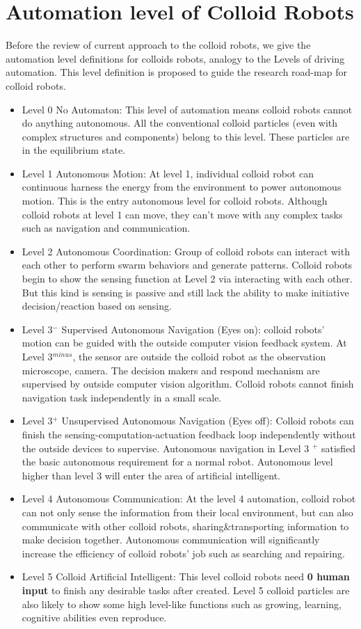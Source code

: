 \section{Automation level of Colloid Robots}
Before the review of current approach to the colloid robots, 
we give the  automation level definitions for colloids robots,  analogy to the Levels of driving automation\cite{taeihagh2019governing}. This level definition is proposed to guide the research road-map for colloid robots.
\begin{itemize}
    \item Level 0 No Automaton: This level of automation means colloid robots cannot do anything autonomous. All the conventional colloid particles (even with complex structures and components) belong to this level. These particles are in the equilibrium state.
    \item Level 1 Autonomous  Motion: At level 1, individual colloid robot can continuous harness the energy from the environment to power autonomous motion. This is the entry autonomous level for colloid robots. Although colloid robots at level 1 can move, they can't move with any complex tasks such as navigation and communication.
    \item Level 2 Autonomous Coordination: Group of colloid robots can interact with each other to perform swarm behaviors and generate patterns. Colloid robots begin to show the sensing function at Level 2 via interacting with each other. But this kind is sensing is passive  and still lack the ability to make initiative decision/reaction based on sensing. 
    \item Level 3$^{-}$ Supervised Autonomous Navigation (Eyes on): colloid robots' motion can be guided with the outside computer vision feedback system. At Level 3$^{minus}$, the sensor are outside the colloid robot as the observation microscope, camera. The decision makers and respond mechanism are supervised by outside computer vision algorithm. Colloid robots cannot finish navigation task independently in a small scale.
    \item Level 3$^{+}$ Unsupervised Autonomous Navigation (Eyes off): Colloid robots can finish the sensing-computation-actuation feedback loop independently without the outside devices to supervise. Autonomous navigation in Level 3 $^{+}$ satisfied the basic autonomous requirement for a normal robot. Autonomous level higher than level 3 will enter the area of artificial intelligent.
    \item Level 4 Autonomous Communication: At the level 4 automation, colloid robot can not only sense the information from their local environment, but can also communicate with other colloid robots, sharing&transporting information to make decision together. Autonomous communication will significantly increase the efficiency of colloid robots' job such as searching and repairing.
    \item Level 5 Colloid Artificial Intelligent: This level colloid robots need \textbf{0 human input} to finish any desirable tasks after created. Level 5 colloid particles are also likely to show some high level-like functions such as 
    growing, learning, cognitive abilities  even reproduce.
\end{itemize}
